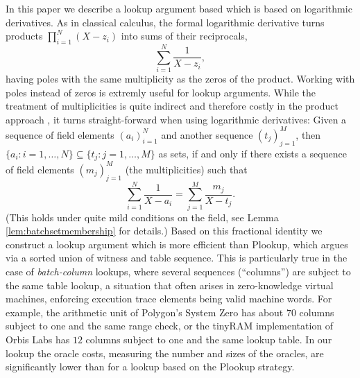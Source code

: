 \documentclass[11pt]{article}
\theoremstyle{definition}
\theoremstyle{definition}
\begin{document}
In this paper we describe a lookup argument based which is based on logarithmic derivatives. 
As in classical calculus, the formal logarithmic derivative turns products $\prod_{i=1}^N (X - z_i)$ into sums of their reciprocals, 
\[
\sum_{i=1}^N \frac{1}{X - z_i},
\]
having poles with the same multiplicity as the zeros of the product.
Working with poles instead of zeros is extremly useful for lookup arguments.
While the treatment of multiplicities is quite indirect and therefore costly in the product approach \cite{Arya, Plookup}, it turns straight-forward when using logarithmic derivatives:
Given a sequence of field elements $(a_i)_{i=1}^N$ and another sequence $(t_j)_{j=1}^M$, then $\{a_i: i =1,\ldots, N\}\subseteq \{t_j : j=1,\ldots, M\}$ as sets, if and only if there exists a sequence of field elements $(m_j)_{j=1}^M$ (the multiplicities) such that
\begin{equation*}
\label{e:intro:lookup:eq}
\sum_{i=1}^N \frac{1}{X - a_i}  = \sum_{j=1}^M \frac{m_j}{X - t_j}.
\end{equation*}
 (This holds under quite mild conditions on the field, see Lemma \ref{lem:batchsetmembership} for details.)
Based on this fractional identity we construct a lookup argument which is more efficient than Plookup, which argues via a sorted union of witness and table sequence.
This is particularly true in the case of \textit{batch-column} lookups, where several sequences (``columns'') are subject to the same table lookup, a situation that often arises in zero-knowledge virtual machines,  enforcing execution trace elements being valid machine words.
For example, the arithmetic unit of Polygon's System Zero \cite{PolygonZero} has about $70$ columns subject to one and the same range check, or the tinyRAM implementation of Orbis Labs \cite{tinyRAMOrbis} has $12$ columns subject to one and the same lookup table. 
In our lookup the oracle costs, measuring the number and sizes of the oracles, are significantly lower than for a lookup based on the Plookup strategy.

\end{document}
